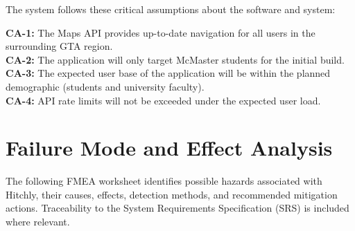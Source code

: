 \documentclass{article}
\begin{document}
The system follows these critical assumptions about the software and system:

\vspace{1em}

\noindent \textbf{CA-1:} The Maps API provides up-to-date navigation for all users in the surrounding GTA region.\\

\noindent \textbf{CA-2:} The application will only target McMaster students for the initial build.\\

\noindent \textbf{CA-3:} The expected user base of the application will be within the planned demographic (students and university faculty).\\

\noindent \textbf{CA-4:} API rate limits will not be exceeded under the expected user load.\\

\section{Failure Mode and Effect Analysis}


The following FMEA worksheet identifies possible hazards associated with Hitchly, their causes,
effects, detection methods, and recommended mitigation actions. Traceability to the System
Requirements Specification (SRS) is included where relevant.
\end{document}
